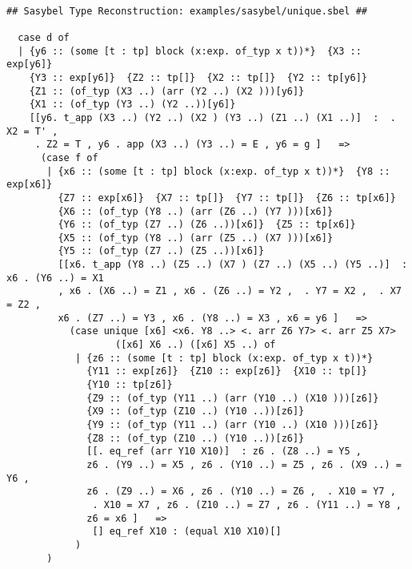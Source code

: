 \documentclass[12pt]{article}
\begin{document}
\footnotesize\begin{verbatim}

## Sasybel Type Reconstruction: examples/sasybel/unique.sbel ##

  case d of
  | {y6 :: (some [t : tp] block (x:exp. of_typ x t))*}  {X3 :: exp[y6]}
    {Y3 :: exp[y6]}  {Z2 :: tp[]}  {X2 :: tp[]}  {Y2 :: tp[y6]}
    {Z1 :: (of_typ (X3 ..) (arr (Y2 ..) (X2 )))[y6]}
    {X1 :: (of_typ (Y3 ..) (Y2 ..))[y6]}
    [[y6. t_app (X3 ..) (Y2 ..) (X2 ) (Y3 ..) (Z1 ..) (X1 ..)]  :  . X2 = T' ,
     . Z2 = T , y6 . app (X3 ..) (Y3 ..) = E , y6 = g ]   =>
      (case f of
       | {x6 :: (some [t : tp] block (x:exp. of_typ x t))*}  {Y8 :: exp[x6]}
         {Z7 :: exp[x6]}  {X7 :: tp[]}  {Y7 :: tp[]}  {Z6 :: tp[x6]}
         {X6 :: (of_typ (Y8 ..) (arr (Z6 ..) (Y7 )))[x6]}
         {Y6 :: (of_typ (Z7 ..) (Z6 ..))[x6]}  {Z5 :: tp[x6]}
         {X5 :: (of_typ (Y8 ..) (arr (Z5 ..) (X7 )))[x6]}
         {Y5 :: (of_typ (Z7 ..) (Z5 ..))[x6]}
         [[x6. t_app (Y8 ..) (Z5 ..) (X7 ) (Z7 ..) (X5 ..) (Y5 ..)]  : x6 . (Y6 ..) = X1
         , x6 . (X6 ..) = Z1 , x6 . (Z6 ..) = Y2 ,  . Y7 = X2 ,  . X7 = Z2 ,
         x6 . (Z7 ..) = Y3 , x6 . (Y8 ..) = X3 , x6 = y6 ]   =>
           (case unique [x6] <x6. Y8 ..> <. arr Z6 Y7> <. arr Z5 X7>
                   ([x6] X6 ..) ([x6] X5 ..) of
            | {z6 :: (some [t : tp] block (x:exp. of_typ x t))*}
              {Y11 :: exp[z6]}  {Z10 :: exp[z6]}  {X10 :: tp[]}
              {Y10 :: tp[z6]}
              {Z9 :: (of_typ (Y11 ..) (arr (Y10 ..) (X10 )))[z6]}
              {X9 :: (of_typ (Z10 ..) (Y10 ..))[z6]}
              {Y9 :: (of_typ (Y11 ..) (arr (Y10 ..) (X10 )))[z6]}
              {Z8 :: (of_typ (Z10 ..) (Y10 ..))[z6]}
              [[. eq_ref (arr Y10 X10)]  : z6 . (Z8 ..) = Y5 ,
              z6 . (Y9 ..) = X5 , z6 . (Y10 ..) = Z5 , z6 . (X9 ..) = Y6 ,
              z6 . (Z9 ..) = X6 , z6 . (Y10 ..) = Z6 ,  . X10 = Y7 ,
               . X10 = X7 , z6 . (Z10 ..) = Z7 , z6 . (Y11 ..) = Y8 ,
              z6 = x6 ]   =>
               [] eq_ref X10 : (equal X10 X10)[]
            )
       )


\end{verbatim}
\end{document}
